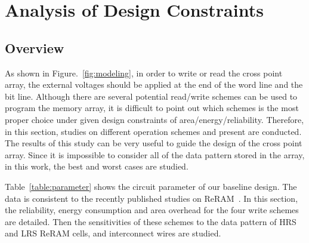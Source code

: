 \vspace{10pt}
\section{Analysis of Design Constraints}\label{sec:wr}

\subsection{Overview}
As shown in Figure.~\ref{fig:modeling}, in order to write or read the
cross point array, the external voltages should be applied at the end of
the word line and the bit line. Although there are several potential
read/write schemes can be used to program the memory array, it is
difficult to point out which schemes is the most proper choice under given
design constraints of area/energy/reliability. Therefore, in this section,
studies on different operation schemes and present are conducted. The
results of this study can be very useful to guide the design of the cross
point array. Since it is impossible to consider all of the data pattern
stored in the array, in this work, the best and worst cases are studied.

Table~\ref{table:parameter} shows the circuit parameter of our baseline
design. The data is consistent to the recently published studies on
ReRAM~\cite{crossbar_TED_2010}\cite{memristor:Cong}. In this section, the
reliability, energy consumption and area overhead for the four write
schemes are detailed. Then the sensitivities of these schemes to the data
pattern of HRS and LRS ReRAM cells, and interconnect wires are studied.


